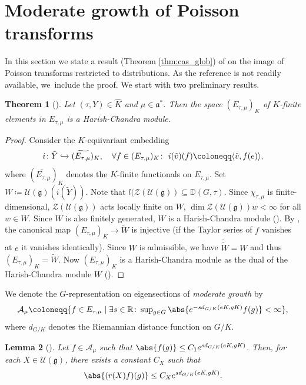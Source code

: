 \documentclass[JEP,XML,SOM,NoFloatCountersInSection,Unicode,published]{cedram}
\def\hto{\mathrel{\lhook\joinrel\to}}
\newtheorem{theorem}{Theorem}[section]
\newtheorem{lemma}[theorem]{Lemma}
\theoremstyle{definition}
\DeclarePairedDelimiter{\abs}\lvert\rvert
\newcommand{\mc}[1]{\ensuremath{\mathcal{#1}}}
\newcommand{\mf}[1]{\ensuremath{\mathfrak{#1}}}
\newcommand{\R}{\ensuremath{\mathbb{R}}}
\begin{document}
\section{Moderate growth of Poisson transforms}
In this section we state a result (Theorem \ref{thm:cas_glob}) of \cite{Ol} on the image of Poisson transforms restricted to distributions. As the reference is not readily available, we~include the proof. We start with two preliminary results.
\begin{theorem}[{\cite[Satz 2.3]{Ol}}]\label{thm:E_Harish_chandra}
Let $(\tau,Y)\in\hat K$ and $\mu\in\mf a^*$. Then the space $(E_{\tau,\mu})_K$ of $K$-finite elements in $E_{\tau,\mu}$ is a Harish-Chandra module.
\end{theorem}
\begin{proof}
Consider the $K$-equivariant embedding
\[
i\colon\tilde Y\hto(\widetilde{E_{\tau,\mu}})_K,\quad\forall f\in(E_{\tau,\mu})_K\colon\ i(\tilde v)(f)\coloneqq\langle\tilde v,f(e)\rangle,
\]
where $(\widetilde{E_{\tau,\mu}})_K$ denotes the $K$-finite functionals on $E_{\tau,\mu}$. Set $W\coloneqq\mc U(\mf g)(i(\tilde Y))$. Note that $l(\mc Z(\mc U(\mf g))\subseteq \mathbb{D}(G,\tau)$. Since $\chi_{\tau,\mu}$ is finite-dimensional, $\mc Z(\mc U(\mf g))$ acts locally finite on $W$, \ie $\dim \mc Z(\mc U(\mf g))w<\infty$ for all $w\in W$. Since $W$ is also finitely generated, $W$ is a Harish-Chandra module (\cite[3.4.7]{W88}). By \cite[Lem.\,2.2]{Min92}, the canonical map $(E_{\tau,\mu})_K\to\tilde W$ is injective (if the Taylor series of $f$ vanishes at $e$ it vanishes identically). Since $W$ is admissible, we have $\tilde{\tilde W}=W$ and thus $(E_{\tau,\mu})_K=\tilde W$. Now $(E_{\tau,\mu})_K$ is a Harish-Chandra module as the dual of the Harish-Chandra module $W$ (\cite[4.3.2]{W88}).
\end{proof}

We denote the $G$-representation on eigensections of \emph{moderate growth} by
\[\textstyle
\mc A_{\mu}\coloneqq\{f\in E_{\tau,\mu}\mid\exists s\in\R\colon\sup_{g\in G}\abs{e^{-sd_{G/K}(eK,gK)}f(g)}<\infty\},
\]
where $d_{G/K}$ denotes the Riemannian distance function on $G/K$.

\begin{lemma}[{\cite[Lem.\,4.12]{Ol}}]
Let $f\in\mc A_{\mu}$ such that $\abs{f(g)}\leq C_1e^{sd_{G/K}(eK,gK)}$. Then, for each $X\in\mc U(\mf g)$, there exists a constant $C_X$ such that
\begin{equation}\label{eq:mod_growth}
\abs{(r(X)f)(g)}\leq C_Xe^{sd_{G/K}(eK,gK)}.
\end{equation}
\end{lemma}
\end{document}
